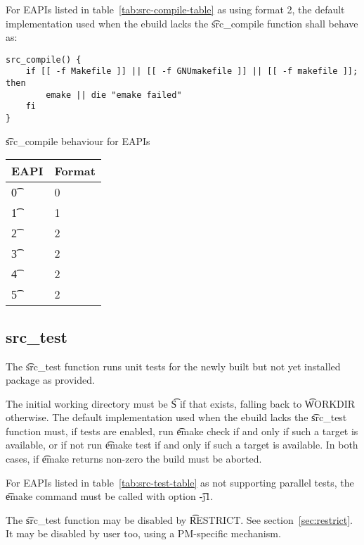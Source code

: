  For EAPIs listed in table~\ref{tab:src-compile-table} as using format
2, the default implementation used when the ebuild lacks the \t{src\_compile} function shall behave
as:

\begin{verbatim}
src_compile() {
    if [[ -f Makefile ]] || [[ -f GNUmakefile ]] || [[ -f makefile ]]; then
        emake || die "emake failed"
    fi
}
\end{verbatim}

\begin{centertable}{\t{src\_compile} behaviour for EAPIs} \label{tab:src-compile-table}
    \begin{tabular}{ l l }
        \toprule
        \multicolumn{1}{c}{\textbf{EAPI}} &
        \multicolumn{1}{c}{\textbf{Format}} \\
        \midrule
    \t{0} & 0 \\
    \t{1} & 1 \\
    \t{2} & 2 \\
    \t{3} & 2 \\
    \t{4} & 2 \\
    \t{5} & 2 \\
    \bottomrule
    \end{tabular}
\end{centertable}

\subsection{src\_test}
\label{sec:src-test-function}

The \t{src\_test} function runs unit tests for the newly built but not yet installed package as
provided.

The initial working directory must be \t{S} if that exists, falling back to \t{WORKDIR} otherwise.
The default implementation used when the ebuild lacks the \t{src\_test} function must, if tests are
enabled, run \t{emake check} if and only if such a target is available, or if not run
\t{emake test} if and only if such a target is available. In both cases, if \t{emake} returns
non-zero the build must be aborted.

 For EAPIs listed in table~\ref{tab:src-test-table} as not supporting
parallel tests, the \t{emake} command must be called with option \t{-j1}.

The \t{src\_test} function may be disabled by \t{RESTRICT}. See section~\ref{sec:restrict}. It may
be disabled by user too, using a PM-specific mechanism.

